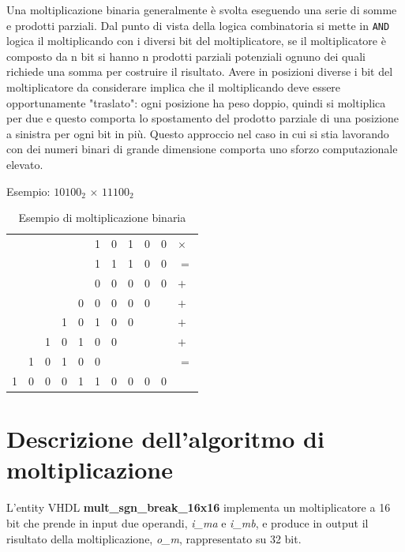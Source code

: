 \documentclass[titlepage]{report}
\begin{document}
		Una moltiplicazione binaria generalmente è svolta eseguendo una serie di somme e prodotti parziali. Dal punto di vista della logica combinatoria si mette in \texttt{AND} logica il moltiplicando con i diversi bit del moltiplicatore, se il moltiplicatore è composto da n bit si hanno n prodotti parziali potenziali ognuno dei quali richiede una somma per costruire il risultato. Avere in posizioni diverse i bit del moltiplicatore da considerare implica che il moltiplicando deve essere opportunamente "traslato": ogni posizione ha peso doppio, quindi si moltiplica per due e questo comporta lo spostamento del prodotto parziale di una posizione a sinistra per ogni bit in più.
		Questo approccio nel caso in cui si stia lavorando con dei numeri binari di grande dimensione
		comporta uno sforzo computazionale elevato.
		
		Esempio: $10100_2\,\times\,11100_2$

		\begin{table}[h!]
			\centering
			\begin{tabular}{*{11}{p{0.5cm}}}
					&  &  &  &  & 1 & 0 & 1 & 0 & 0 & $\times$  \\
					&  &  &  &  & 1 & 1 & 1 & 0 & 0 & $=$ \\
				\cline{1-11}
				& & & &  & 0 & 0 & 0 & 0 & 0 & $+$ \\
				& & & & 0 & 0 & 0 & 0 & 0 &  & $+$ \\
				& &  & 1 & 0 & 1 & 0 & 0 &  &  & $+$ \\
				& & 1 & 0 & 1 & 0 & 0 &   &  &  & $+$ \\
			 	& 1 & 0 & 1 & 0 & 0 &   &   &  &  & $=$ \\
				\cline{1-11}
				 1 & 0 & 0 & 0 & 1 & 1 & 0 & 0 & 0 & 0 & \\
			\end{tabular}
			\caption{Esempio di moltiplicazione binaria}
			\label{tab:es_mult_bin}
		\end{table}
	\section*{Descrizione dell'algoritmo di moltiplicazione}
	\label{sec:algoritmo_moltiplicazione}
		L'entity VHDL \textbf{mult\_sgn\_break\_16x16} implementa un moltiplicatore a 16 bit che prende in input due operandi, \textit{i\_ma} e \textit{i\_mb}, e produce in output il risultato della moltiplicazione, \textit{o\_m}, rappresentato su 32 bit.
\end{document}
